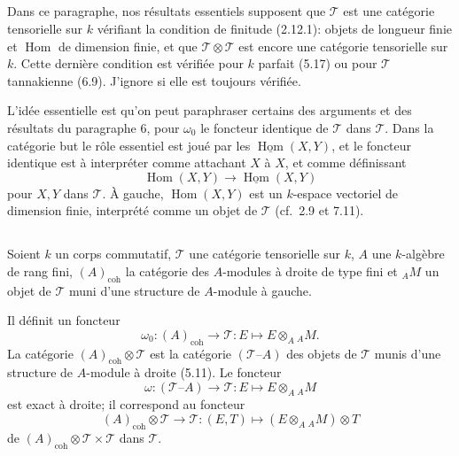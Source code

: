 \documentclass[12pt,a4paper]{article}
\theoremstyle{plain}
\theoremstyle{definition}
\DeclareMathOperator{\Hom}{Hom}
\newcommand{\coh}{\mathrm{coh}}
\begin{document}
\subsection{}

Dans ce paragraphe, nos résultats essentiels supposent que $\mathcal{T}$ est une catégorie tensorielle sur $k$ vérifiant la condition de finitude (2.12.1): objets de longueur finie et $\Hom$ de dimension finie, et que $\mathcal{T} \otimes \mathcal{T}$ est encore une catégorie tensorielle sur $k$. Cette dernière condition est vérifiée pour $k$ parfait (5.17) ou pour $\mathcal{T}$ tannakienne (6.9). J'ignore si elle est toujours vérifiée.

L'idée essentielle est qu'on peut paraphraser certains des arguments et des résultats du paragraphe 6, pour $\omega_0$ le foncteur identique de $\mathcal{T}$ dans $\mathcal{T}$. Dans la catégorie but le rôle essentiel est joué par les $\underline{\Hom}(X, Y)$, et le foncteur identique est à interpréter comme attachant $X$ à $X$, et comme définissant
\[
\Hom(X, Y) \to \underline{\Hom}(X, Y)
\]
pour $X, Y$ dans $\mathcal{T}$. À gauche, $\Hom(X, Y)$ est un $k$-espace vectoriel de dimension finie, interprété comme un objet de $\mathcal{T}$ (cf.~2.9 et 7.11).

\subsection{}

Soient $k$ un corps commutatif, $\mathcal{T}$ une catégorie tensorielle sur $k$, $A$ une $k$-algèbre de rang fini, $(A)_{\coh}$ la catégorie des $A$-modules à droite de type fini et $_A M$ un objet de $\mathcal{T}$ muni d'une structure de $A$-module à gauche.

Il définit un foncteur
\[
\omega_0 : (A)_{\coh} \to \mathcal{T} : E \mapsto E \otimes_A {_A M}.
\]
La catégorie $(A)_{\coh} \otimes \mathcal{T}$ est la catégorie $(\mathcal{T} \text{--} A)$ des objets de $\mathcal{T}$ munis d'une structure de $A$-module à droite (5.11). Le foncteur
\[
\omega : (\mathcal{T} \text{--} A) \to \mathcal{T} : E \mapsto E \otimes_A {_A M}
\]
est exact à droite; il correspond au foncteur
\[
(A)_{\coh} \otimes \mathcal{T} \to \mathcal{T} : (E, T) \mapsto (E \otimes_A {_A M}) \otimes T
\]
de $(A)_{\coh} \otimes \mathcal{T} \times \mathcal{T}$ dans $\mathcal{T}$.
\end{document}
